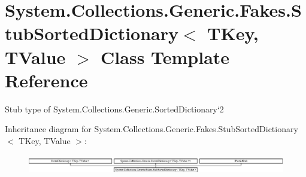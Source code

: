 \hypertarget{class_system_1_1_collections_1_1_generic_1_1_fakes_1_1_stub_sorted_dictionary_3_01_t_key_00_01_t_value_01_4}{\section{System.\-Collections.\-Generic.\-Fakes.\-Stub\-Sorted\-Dictionary$<$ T\-Key, T\-Value $>$ Class Template Reference}
\label{class_system_1_1_collections_1_1_generic_1_1_fakes_1_1_stub_sorted_dictionary_3_01_t_key_00_01_t_value_01_4}
}


Stub type of System.\-Collections.\-Generic.\-Sorted\-Dictionary`2 


Inheritance diagram for System.\-Collections.\-Generic.\-Fakes.\-Stub\-Sorted\-Dictionary$<$ T\-Key, T\-Value $>$\-:\begin{figure}[H]
\begin{center}
\leavevmode
\includegraphics[height=0.850418cm]{class_system_1_1_collections_1_1_generic_1_1_fakes_1_1_stub_sorted_dictionary_3_01_t_key_00_01_t_value_01_4}
\end{center}
\end{figure}
